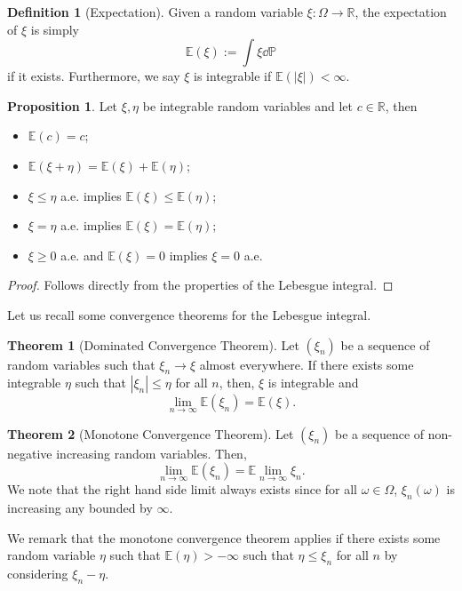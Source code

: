 \documentclass[]{article}
\theoremstyle{definition}
\newtheorem{theorem}{Theorem}
\theoremstyle{definition}
\newtheorem{definition}{Definition}[section]
\newtheorem{proposition}{Proposition}[section]
\begin{document}
\begin{definition}[Expectation]
  Given a random variable \(\xi : \Omega \to \mathbb{R}\), the expectation of \(\xi\) 
  is simply
  \[\mathbb{E}(\xi) := \int \xi \dd \mathbb{P}\]
  if it exists. Furthermore, we say \(\xi\) is integrable if \(\mathbb{E}(|\xi|) < \infty\). 
\end{definition}

\begin{proposition}
  Let \(\xi, \eta\) be integrable random variables and let \(c \in \mathbb{R}\), 
  then 
  \begin{itemize}
    \item \(\mathbb{E}(c) = c\);
    \item \(\mathbb{E}(\xi + \eta) = \mathbb{E}(\xi) + \mathbb{E}(\eta)\);
    \item \(\xi \le \eta\) a.e. implies \(\mathbb{E}(\xi) \le \mathbb{E}(\eta)\); 
    \item \(\xi = \eta\) a.e. implies \(\mathbb{E}(\xi) = \mathbb{E}(\eta)\); 
    \item \(\xi \ge 0\) a.e. and \(\mathbb{E}(\xi) = 0\) implies \(\xi = 0\) a.e.
  \end{itemize}
\end{proposition}
\begin{proof}
  Follows directly from the properties of the Lebesgue integral.
\end{proof}

Let us recall some convergence theorems for the Lebesgue integral.

\begin{theorem}[Dominated Convergence Theorem]
  Let \((\xi_n)\) be a sequence of random variables such that \(\xi_n \to \xi\) 
  almost everywhere. If there exists some integrable \(\eta\) such that 
  \(|\xi_n| \le \eta\) for all \(n\), then, \(\xi\) is integrable and 
  \[\lim_{n \to \infty} \mathbb{E}(\xi_n) = \mathbb{E}(\xi).\]
\end{theorem}

\begin{theorem}[Monotone Convergence Theorem]
  Let \((\xi_n)\) be a sequence of non-negative increasing random variables. Then, 
  \[\lim_{n \to \infty} \mathbb{E}(\xi_n) = \mathbb{E} \lim_{n \to \infty} \xi_n.\]
  We note that the right hand side limit always exists since for all \(\omega \in \Omega\),
  \(\xi_n(\omega)\) is increasing any bounded by \(\infty\).
\end{theorem}

We remark that the monotone convergence theorem applies if there exists some 
random variable \(\eta\) such that \(\mathbb{E}(\eta) > -\infty\) such that 
\(\eta \le \xi_n\) for all \(n\) by considering \(\xi_n - \eta\).
\end{document}
